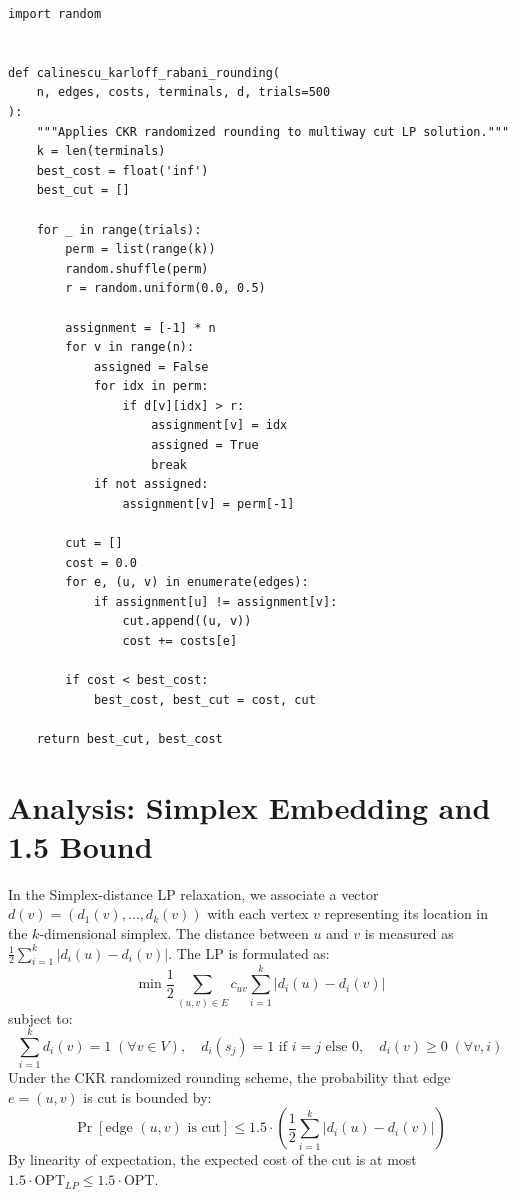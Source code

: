 \begin{lstlisting}[style=python, caption=CKR Randomized Rounding for Multiway Cut]
import random


def calinescu_karloff_rabani_rounding(
    n, edges, costs, terminals, d, trials=500
):
    """Applies CKR randomized rounding to multiway cut LP solution."""
    k = len(terminals)
    best_cost = float('inf')
    best_cut = []
    
    for _ in range(trials):
        perm = list(range(k))
        random.shuffle(perm)
        r = random.uniform(0.0, 0.5)
        
        assignment = [-1] * n
        for v in range(n):
            assigned = False
            for idx in perm:
                if d[v][idx] > r:
                    assignment[v] = idx
                    assigned = True
                    break
            if not assigned:
                assignment[v] = perm[-1]
                
        cut = []
        cost = 0.0
        for e, (u, v) in enumerate(edges):
            if assignment[u] != assignment[v]:
                cut.append((u, v))
                cost += costs[e]
                
        if cost < best_cost:
            best_cost, best_cut = cost, cut
            
    return best_cut, best_cost
\end{lstlisting}

\section{Analysis: Simplex Embedding and 1.5 Bound}
In the Simplex-distance LP relaxation, we associate a vector $d(v) = (d_1(v), \dots, d_k(v))$ with each vertex $v$ representing its location in the $k$-dimensional simplex.
The distance between $u$ and $v$ is measured as $\frac{1}{2} \sum_{i=1}^k |d_i(u) - d_i(v)|$.
The LP is formulated as:
\[
\min \frac{1}{2} \sum_{(u,v) \in E} c_{uv} \sum_{i=1}^k |d_i(u) - d_i(v)|
\]
subject to:
\[
\sum_{i=1}^k d_i(v) = 1 \; (\forall v \in V), \quad d_i(s_j) = 1 \text{ if } i = j \text{ else } 0, \quad d_i(v) \ge 0 \; (\forall v, i)
\]
Under the CKR randomized rounding scheme, the probability that edge $e=(u,v)$ is cut is bounded by:
\[
\Pr[\text{edge } (u,v) \text{ is cut}] \le 1.5 \cdot \left( \frac{1}{2} \sum_{i=1}^k |d_i(u) - d_i(v)| \right)
\]
By linearity of expectation, the expected cost of the cut is at most $1.5 \cdot \text{OPT}_{LP} \le 1.5 \cdot \text{OPT}$.

